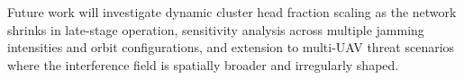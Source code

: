 \documentclass[conference]{IEEEtran}
\begin{document}
Future work will investigate dynamic cluster head fraction scaling as the
network shrinks in late-stage operation, sensitivity analysis across
multiple jamming intensities and orbit configurations, and extension to
multi-UAV threat scenarios where the interference field is spatially
broader and irregularly shaped.


\end{document}
